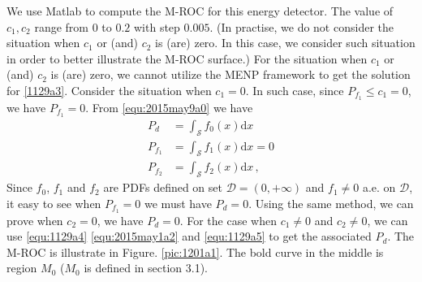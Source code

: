 We use Matlab to compute the M-ROC for this energy detector. The value of $c_1, c_2$ range from $0$ to $0.2$ with step $0.005$. (In practise, we do not consider the situation when $c_1$ or (and) $c_2$ is (are) zero. In this case, we consider such situation in order to better illustrate the M-ROC surface.) 
For the situation when $c_1$ or (and) $c_2$ is (are) zero, we cannot utilize the MENP framework to get the solution for \eqref{1129a3}. Consider the situation when $c_1 = 0$. In such case, since $P_{f_1} \leq c_1 = 0$, we have $P_{f_1} = 0$. From \eqref{equ:2015may9a0} we have 
\begin{equation}
  \begin{split}
    P_d &= \int_{\mathcal{S}}f_0(x)\mathrm{d}x\\
    P_{f_1} &= \int_{\mathcal{S}}f_1(x)\mathrm{d}x = 0\\
    P_{f_2} &= \int_{\mathcal{S}}f_2(x)\mathrm{d}x\,,
  \end{split}
\end{equation}
Since $f_0$, $f_1$ and $f_2$ are PDFs defined on set $\mathcal{D} = (0, +\infty)$ and $f_1 \neq 0$ a.e. on $\mathcal{D}$, it easy to see when $P_{f_1} = 0$ we must have $P_d = 0$. Using the same method, we can prove when $c_2 = 0$, we have $P_d = 0$.   
For the case when $c_1 \neq 0$ and $c_2 \neq 0$, we can use  \eqref{equ:1129a4} \eqref{equ:2015may1a2} and \eqref{equ:1129a5} to get the associated $P_d$. The M-ROC is illustrate in Figure. \ref{pic:1201a1}. The bold curve in the middle is region $M_0$ ($M_0$ is defined in section 3.1). 

